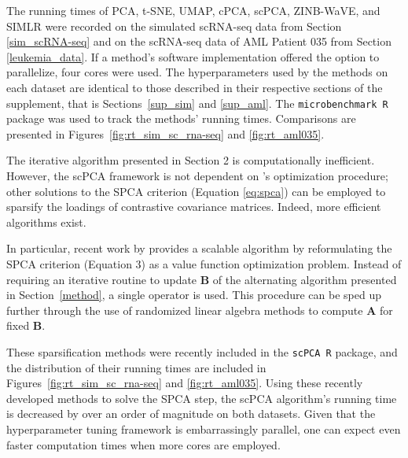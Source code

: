 \documentclass{article}
\begin{document}
The running times of PCA, t-SNE, UMAP, cPCA, scPCA, ZINB-WaVE, and SIMLR were recorded on the simulated scRNA-seq data from Section \ref{sim_scRNA-seq} and on the scRNA-seq data of AML Patient 035 from Section \ref{leukemia_data}.
If a method's software implementation offered the option to parallelize, four cores were used. The hyperparameters used by the methods on each dataset are identical to those described in their respective sections of the supplement, that is Sections~\ref{sup_sim} and \ref{sup_aml}. The \texttt{microbenchmark R} package was used to track the methods' running times. Comparisons are presented in Figures~\ref{fig:rt_sim_sc_rna-seq} and \ref{fig:rt_aml035}.

The iterative algorithm presented in Section 2 is computationally inefficient. However, the scPCA framework is not dependent on \citet{Zou2006}'s optimization procedure; other solutions to the SPCA criterion (Equation \ref{eq:spca}) can be employed to sparsify the loadings of contrastive covariance matrices. Indeed, more efficient algorithms exist.

In particular, recent work by \citet{erichson2018sparse} provides a scalable algorithm by reformulating the SPCA criterion (Equation 3) as a value function optimization problem. Instead of requiring an iterative routine to update $\mathbf{B}$ of the alternating algorithm presented in Section~\ref{method}, a single operator is used. This procedure can be sped up further through the use of randomized linear algebra methods to compute $\mathbf{A}$ for fixed $\mathbf{B}$.

These sparsification methods were recently included in the \texttt{scPCA R} package, and the distribution of their running times are included in Figures~\ref{fig:rt_sim_sc_rna-seq} and \ref{fig:rt_aml035}. Using these recently developed methods to solve the SPCA step, the scPCA algorithm's running time is decreased by over an order of magnitude on both datasets. Given that the hyperparameter tuning framework is embarrassingly parallel, one can expect even faster computation times when more cores are employed.
\end{document}
